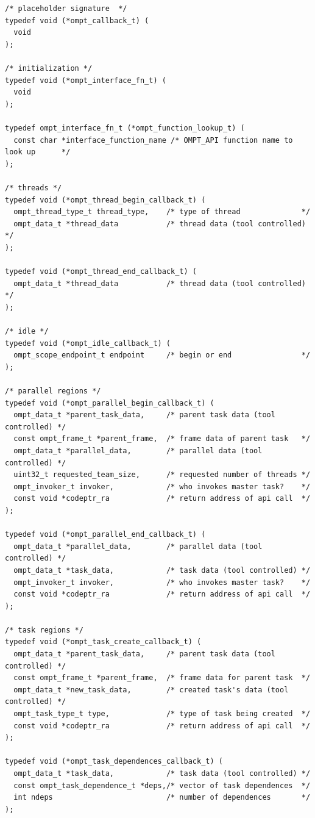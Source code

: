 \documentclass{article}
\begin{document}
\begin{verbatim}
/* placeholder signature  */
typedef void (*ompt_callback_t) (    
  void
);

/* initialization */
typedef void (*ompt_interface_fn_t) (
  void
);

typedef ompt_interface_fn_t (*ompt_function_lookup_t) (
  const char *interface_function_name /* OMPT_API function name to look up      */
);

/* threads */
typedef void (*ompt_thread_begin_callback_t) (
  ompt_thread_type_t thread_type,    /* type of thread              */
  ompt_data_t *thread_data           /* thread data (tool controlled) */
);

typedef void (*ompt_thread_end_callback_t) (
  ompt_data_t *thread_data           /* thread data (tool controlled) */
);

/* idle */
typedef void (*ompt_idle_callback_t) ( 
  ompt_scope_endpoint_t endpoint     /* begin or end                */
);

/* parallel regions */
typedef void (*ompt_parallel_begin_callback_t) (
  ompt_data_t *parent_task_data,     /* parent task data (tool controlled) */
  const ompt_frame_t *parent_frame,  /* frame data of parent task   */
  ompt_data_t *parallel_data,        /* parallel data (tool controlled) */
  uint32_t requested_team_size,      /* requested number of threads */
  ompt_invoker_t invoker,            /* who invokes master task?    */
  const void *codeptr_ra             /* return address of api call  */ 
);

typedef void (*ompt_parallel_end_callback_t) (
  ompt_data_t *parallel_data,        /* parallel data (tool controlled) */
  ompt_data_t *task_data,            /* task data (tool controlled) */
  ompt_invoker_t invoker,            /* who invokes master task?    */
  const void *codeptr_ra             /* return address of api call  */ 
);

/* task regions */
typedef void (*ompt_task_create_callback_t) ( 
  ompt_data_t *parent_task_data,     /* parent task data (tool controlled) */
  const ompt_frame_t *parent_frame,  /* frame data for parent task  */
  ompt_data_t *new_task_data,        /* created task's data (tool controlled) */
  ompt_task_type_t type,             /* type of task being created  */ 
  const void *codeptr_ra             /* return address of api call  */ 
);

typedef void (*ompt_task_dependences_callback_t) (                                   
  ompt_data_t *task_data,            /* task data (tool controlled) */
  const ompt_task_dependence_t *deps,/* vector of task dependences  */
  int ndeps                          /* number of dependences       */
);


\end{verbatim}
\end{document}
